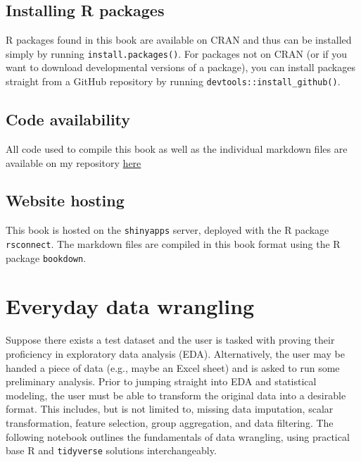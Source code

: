 \documentclass[
]{book}
\begin{document}
\hypertarget{installing-r-packages}{%
\section{Installing R packages}\label{installing-r-packages}}

R packages found in this book are available on CRAN and thus can be installed simply by running \texttt{install.packages()}. For packages not on CRAN (or if you want to download developmental versions of a package), you can install packages straight from a GitHub repository by running \texttt{devtools::install\_github()}.

\hypertarget{code-availability}{%
\section{Code availability}\label{code-availability}}

All code used to compile this book as well as the individual markdown files are available on my repository \href{https://github.com/snowoflondon/everyday-r}{here}

\hypertarget{website-hosting}{%
\section{Website hosting}\label{website-hosting}}

This book is hosted on the \texttt{shinyapps} server, deployed with the R package \texttt{rsconnect}. The markdown files are compiled in this book format using the R package \texttt{bookdown}.

\hypertarget{everyday-data-wrangling}{%
\chapter{Everyday data wrangling}\label{everyday-data-wrangling}}

Suppose there exists a test dataset and the user is tasked with proving their proficiency in exploratory data analysis (EDA). Alternatively, the user may be handed a piece of data (e.g., maybe an Excel sheet) and is asked to run some preliminary analysis. Prior to jumping straight into EDA and statistical modeling, the user must be able to transform the original data into a desirable format. This includes, but is not limited to, missing data imputation, scalar transformation, feature selection, group aggregation, and data filtering. The following notebook outlines the fundamentals of data wrangling, using practical base R and \texttt{tidyverse} solutions interchangeably.
\end{document}

